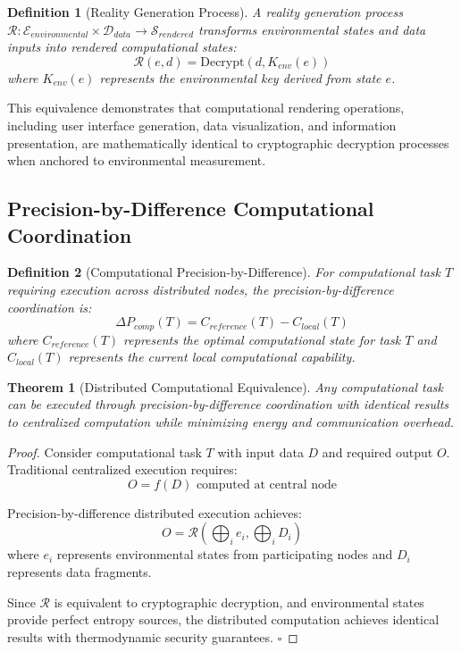\documentclass[12pt]{article}
\newtheorem{definition}{Definition}
\newtheorem{theorem}{Theorem}
\begin{document}
\begin{definition}[Reality Generation Process]
A reality generation process $\mathcal{R}: \mathcal{E}_{environmental} \times \mathcal{D}_{data} \to \mathcal{S}_{rendered}$ transforms environmental states and data inputs into rendered computational states:
\begin{equation}
\mathcal{R}(e, d) = \text{Decrypt}(d, K_{env}(e))
\end{equation}
where $K_{env}(e)$ represents the environmental key derived from state $e$.
\end{definition}

This equivalence demonstrates that computational rendering operations, including user interface generation, data visualization, and information presentation, are mathematically identical to cryptographic decryption processes when anchored to environmental measurement.

\subsection{Precision-by-Difference Computational Coordination}

\begin{definition}[Computational Precision-by-Difference]
For computational task $T$ requiring execution across distributed nodes, the precision-by-difference coordination is:
\begin{equation}
\Delta P_{comp}(T) = C_{reference}(T) - C_{local}(T)
\end{equation}
where $C_{reference}(T)$ represents the optimal computational state for task $T$ and $C_{local}(T)$ represents the current local computational capability.
\end{definition}

\begin{theorem}[Distributed Computational Equivalence]
Any computational task can be executed through precision-by-difference coordination with identical results to centralized computation while minimizing energy and communication overhead.
\end{theorem}

\begin{proof}
Consider computational task $T$ with input data $D$ and required output $O$. Traditional centralized execution requires:
\begin{equation}
O = f(D) \text{ computed at central node}
\end{equation}

Precision-by-difference distributed execution achieves:
\begin{equation}
O = \mathcal{R}\left(\bigoplus_{i} e_i, \bigoplus_{i} D_i\right)
\end{equation}
where $e_i$ represents environmental states from participating nodes and $D_i$ represents data fragments.

Since $\mathcal{R}$ is equivalent to cryptographic decryption, and environmental states provide perfect entropy sources, the distributed computation achieves identical results with thermodynamic security guarantees. $\square$
\end{proof}
\end{document}

